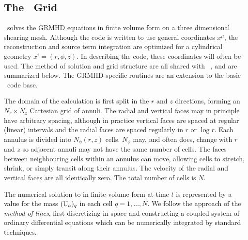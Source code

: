 \subsection{The \grdisco\ Grid}

\grdisco\ solves the GRMHD equations in finite volume form  on a three dimensional shearing mesh.  Although the code is written to use general coordinates $x^\mu$, the reconstruction and source term integration are optimized for a cylindrical geometry $x^i = (r, \phi, z)$.  In describing the code, these coordinates will often be used.  The method of solution and grid structure are all shared with \disco\ \citep{Duffell16}, and are summarized below.  The GRMHD-specific routines are an extension to the basic \disco\ code base.

The domain of the calculation is first split in the $r$ and $z$ directions, forming an $N_r\times N_z$ Cartesian grid of annuli.  The radial and vertical faces may in principle have arbitrary spacing, although in practice vertical faces are spaced at regular (linear) intervals and the radial faces are spaced regularly in $r$ or $\log r$.  Each annulus is divided into $N_\phi(r,z)$ cells.  $N_\phi$ may, and often does, change with $r$ and $z$ so adjacent annuli may not have the same number of cells.  The faces between neighbouring cells within an annulus can move, allowing cells to stretch, shrink, or simply transit along their annulus.  The velocity of the radial and vertical faces are all identically zero.  The total number of cells is $N$.

The numerical solution to  in finite volume form  at time $t$ is represented by a value for the mass $(\mathrm{U}_a)_q$ in each cell $q=1,\dots,N$.  We follow the approach of the \emph{method of lines}, first discretizing in space and constructing a coupled system of ordinary differential equations which can be numerically integrated by standard techniques.

